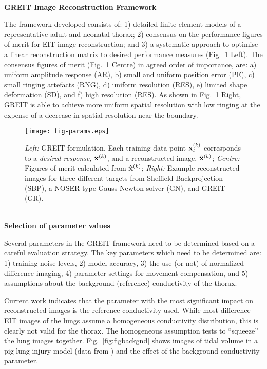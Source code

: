 \documentclass[12pt]{article}
\newcommand{\mysection}[1]{
~\\ \noindent
{\bf \normalsize #1}
\vspace{1mm}
}
\begin{document}
\vspace{-3mm}
\mysection{GREIT Image Reconstruction Framework}

The framework developed\cite{GREIT09} consists of: 1)
detailed finite element models of a representative adult
and neonatal thorax; 2) consensus on the performance
figures of merit for EIT image reconstruction; and 3) a
systematic approach to optimise a linear reconstruction
matrix to desired performance measures (Fig.\ \ref{fig:figparams} Left).
The consensus figures of merit (Fig.\ \ref{fig:figparams} Centre)
 in agreed order of importance,
are: a) uniform amplitude response (AR), b) small and
uniform position error (PE), c) small ringing artefacts (RNG),
d) uniform resolution (RES), e) limited shape deformation (SD),
and f) high resolution (RES). 
As shown in Fig.\ \ref{fig:figparams} Right, GREIT is able to 
achieve more uniform spatial resolution with low ringing at the
expense of a decrease in spatial resolution near the boundary.
\vspace{-4mm}
\begin{figure}[htp]
\centering
\texttt{[image: fig-params.eps]}
\vspace{-6mm}
\caption{%
\small
{\em Left:} GREIT formulation. Each training data point
    ${\bf x}_t^{(k)}$ corresponds to a {\em desired response},
$\tilde{\bf x}^{(k)}$, and a reconstructed image,
  $\hat{\bf x}^{(k)}$;
{\em Centre:} Figures of merit calculated from $\hat{\bf x}^{(k)}$;
{\em Right:} Example reconstructed images for three different
targets from
Sheffield Backprojection (SBP), a NOSER type Gauss-Newton solver (GN),
and GREIT (GR).
}
\label{fig:figparams}
\end{figure}

\vspace{-8mm}
\mysection{Selection of parameter values}

Several parameters in the GREIT framework need to be
determined based on a careful evaluation strategy.
The key parameters which need to
be determined are:
1) training noise levels,
2) model accuracy,
3) the use (or not) of normalized difference imaging,
4) parameter settings for movement compensation, and
5) assumptions about the background (reference)
   conductivity of the thorax.

Current work indicates that the parameter with the most
significant impact on reconstructed images is the
reference conductivity used. While most difference EIT
images of the lungs assume a homogeneous conductivity 
distribution, this is clearly not valid for the thorax. 
The homogeneous assumption tests to ``squeeze'' the lung
images together. Fig.\ \ref{fig:figbackgnd} shows images
of tidal volume in a pig lung injury model (data from 
\cite{frerichs03}) and the effect of the background
conductivity parameter. 
\end{document}
